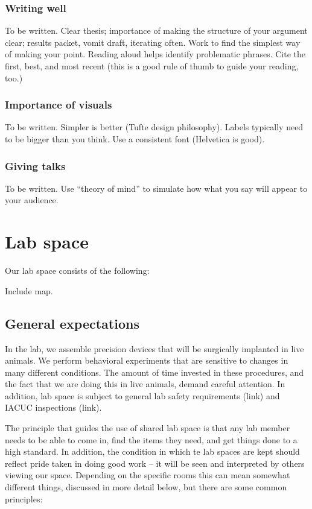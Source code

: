 \documentclass{tufte-book}
\begin{document}
\subsection{Writing well}

To be written. Clear thesis; importance of making the structure of
your argument clear; results packet, vomit draft, iterating
often. Work to find the simplest way of making your point. Reading
aloud helps identify problematic phrases. Cite the first, best, and
most recent (this is a good rule of thumb to guide your reading, too.)

\subsection{Importance of visuals}

To be written. Simpler is better (Tufte design philosophy). Labels
typically need to be bigger than you think. Use a consistent font
(Helvetica is good).

\subsection{Giving talks}

To be written. Use ``theory of mind'' to simulate how what you say
will appear to your audience.


\chapter{Lab space}

Our lab space consists of the following:

Include map.

\section{General expectations}

In the lab, we assemble precision devices that will be surgically
implanted in live animals. We perform behavioral experiments that are
sensitive to changes in many different conditions. The amount of time
invested in these procedures, and the fact that we are doing this in
live animals, demand careful attention. In addition, lab space is
subject to general lab safety requirements (link) and IACUC
inspections (link).

The principle that guides the use of shared lab space is that any lab
member needs to be able to come in, find the items they need, and get
things done to a high standard. In addition, the condition in which te
lab spaces are kept should reflect pride taken in doing good work --
it will be seen and interpreted by others viewing our space.
Depending on the specific rooms this can mean somewhat different
things, discussed in more detail below, but there are some common
principles:
\end{document}
